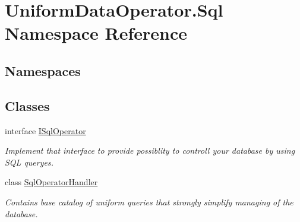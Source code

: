\hypertarget{namespace_uniform_data_operator_1_1_sql}{}\section{Uniform\+Data\+Operator.\+Sql Namespace Reference}
\label{namespace_uniform_data_operator_1_1_sql}
\subsection*{Namespaces}
\begin{DoxyCompactItemize}
\end{DoxyCompactItemize}
\subsection*{Classes}
\begin{DoxyCompactItemize}
\item 
interface \mbox{\hyperlink{interface_uniform_data_operator_1_1_sql_1_1_i_sql_operator}{I\+Sql\+Operator}}
\begin{DoxyCompactList}\small\item\em Implement that interface to provide possiblity to controll your database by using S\+QL queryes. \end{DoxyCompactList}\item 
class \mbox{\hyperlink{class_uniform_data_operator_1_1_sql_1_1_sql_operator_handler}{Sql\+Operator\+Handler}}
\begin{DoxyCompactList}\small\item\em Contains base catalog of uniform queries that strongly simplify managing of the database. \end{DoxyCompactList}\end{DoxyCompactItemize}
